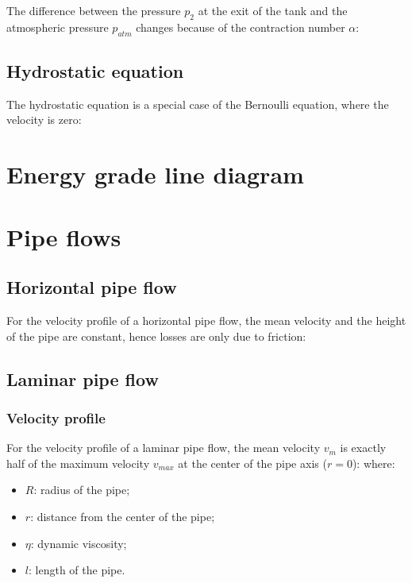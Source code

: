 \documentclass{article}
\begin{document}
The difference between the pressure $p_2$ at the exit of the tank and the atmospheric pressure $p_{atm}$
changes because of the contraction number $\alpha$:

\subsection{Hydrostatic equation}
The hydrostatic equation is a special case of the Bernoulli equation, where the velocity is zero:

\newpage
\section{Energy grade line diagram}


\newpage
\section{Pipe flows}
\subsection{Horizontal pipe flow}
For the velocity profile of a horizontal pipe flow, the mean velocity and the height
of the pipe are constant, hence losses are only due to friction:

\subsection{Laminar pipe flow}
\subsubsection{Velocity profile}
For the velocity profile of a laminar pipe flow, the mean velocity $v_m$ is exactly
half of the maximum velocity $v_{max}$ at the center of the pipe axis ($r=0$):
where:
\begin{itemize}
    \item $R$: radius of the pipe;
    \item $r$: distance from the center of the pipe;
    \item $\eta$: dynamic viscosity;
    \item $l$: length of the pipe.
\end{itemize}
\end{document}
